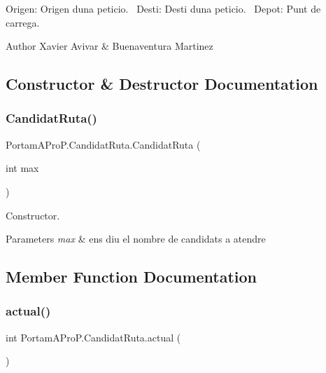 Origen\+: Origen d\textquotesingle{}una peticio.~\newline
Desti\+: Desti d\textquotesingle{}una peticio.~\newline
Depot\+: Punt de carrega.~\newline
 \begin{DoxyAuthor}{Author}
Xavier Avivar \& Buenaventura Martinez 
\end{DoxyAuthor}


\subsection{Constructor \& Destructor Documentation}
\mbox{\label{class_portam_a_pro_p_1_1_candidat_ruta_a8527d8e2dde3cbf74d6ef61d3fc9d2bf}} 
\subsubsection{\texorpdfstring{Candidat\+Ruta()}{CandidatRuta()}}
{\footnotesize\ttfamily Portam\+A\+Pro\+P.\+Candidat\+Ruta.\+Candidat\+Ruta (\begin{DoxyParamCaption}\item[{int}]{max }\end{DoxyParamCaption})}



Constructor. 


\begin{DoxyParams}{Parameters}
{\em max} & ens diu el nombre de candidats a atendre \\
\hline
\end{DoxyParams}


\subsection{Member Function Documentation}
\mbox{\label{class_portam_a_pro_p_1_1_candidat_ruta_aea24df02d878f7c7040954f6b6a31ff0}} 
\subsubsection{\texorpdfstring{actual()}{actual()}}
{\footnotesize\ttfamily int Portam\+A\+Pro\+P.\+Candidat\+Ruta.\+actual (\begin{DoxyParamCaption}{ }\end{DoxyParamCaption})}



